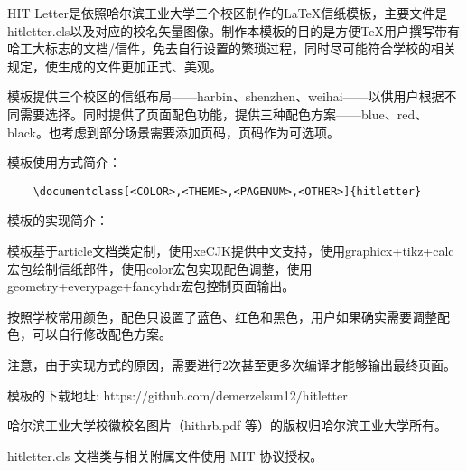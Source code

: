 \documentclass[blue,harbin,pagenum,12pt]{hitletter}
\begin{document}
HIT Letter是依照哈尔滨工业大学三个校区制作的\LaTeX 信纸模板，主要文件是hitletter.cls以及对应的校名矢量图像。制作本模板的目的是方便\TeX 用户撰写带有哈工大标志的文档/信件，免去自行设置的繁琐过程，同时尽可能符合学校的相关规定，使生成的文件更加正式、美观。

模板提供三个校区的信纸布局——harbin、shenzhen、weihai——以供用户根据不同需要选择。同时提供了页面配色功能，提供三种配色方案——blue、red、black。也考虑到部分场景需要添加页码，页码作为可选项。

模板使用方式简介：
\begin{verbatim}
	\documentclass[<COLOR>,<THEME>,<PAGENUM>,<OTHER>]{hitletter}
\end{verbatim}


模板的实现简介：

模板基于article文档类定制，使用xeCJK提供中文支持，使用graphicx+tikz+calc宏包绘制信纸部件，使用color宏包实现配色调整，使用geometry+everypage+fancyhdr宏包控制页面输出。

按照学校常用颜色，配色只设置了蓝色、红色和黑色，用户如果确实需要调整配色，可以自行修改配色方案。

注意，由于实现方式的原因，需要进行2次甚至更多次编译才能够输出最终页面。

模板的下载地址:
https://github.com/demerzelsun12/hitletter

哈尔滨工业大学校徽校名图片（hithrb.pdf 等）的版权归哈尔滨工业大学所有。

hitletter.cls 文档类与相关附属文件使用 MIT 协议授权。

~

\lipsum[1-5]
\end{document}
